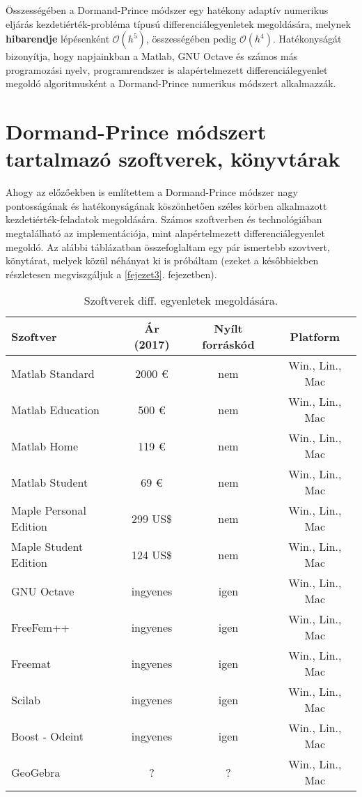 Összességében a Dormand-Prince módszer egy hatékony adaptív numerikus eljárás kezdetiérték-probléma típusú differenciálegyenletek megoldására, melynek \textbf{hibarendje} lépésenként \textbf{$\mathcal{O}(h^{5})$}, összességében pedig \textbf{ $\mathcal{O}(h^{4})$}. Hatékonyságát bizonyítja, hogy napjainkban a Matlab, GNU Octave és számos más programozási nyelv, programrendszer is alapértelmezett differenciálegyenlet megoldó algoritmusként a Dormand-Prince numerikus módszert alkalmazzák.

\section {Dormand-Prince módszert tartalmazó szoftverek, könyvtárak} \label{fejezet1_5}

Ahogy az előzőekben is említettem a Dormand-Prince módszer nagy pontosságának és hatékonyságának köszönhetően széles körben alkalmazott kezdetiérték-feladatok megoldására. Számos szoftverben és technológiában megtalálható az implementációja, mint alapértelmezett differenciálegyenlet megoldó. Az alábbi táblázatban összefoglaltam egy pár ismertebb szovtvert, könytárat, melyek közül néhányat ki is próbáltam (ezeket a későbbiekben részletesen megviszgáljuk a \ref{fejezet3}. fejezetben).
\begin{table}[h!]
	\centering
	\begin{tabular}{ | l | c | c | c |}
		\hline 
		\textbf{Szoftver} & \textbf{Ár (2017)} & \textbf{Nyílt forráskód} & \textbf{Platform}\\
		\hline
		Matlab Standard & 2000 \euro & nem & Win., Lin., Mac\\
		\hline
		Matlab Education & 500 \euro & nem & Win., Lin., Mac\\
		\hline
		Matlab Home & 119 \euro & nem & Win., Lin., Mac\\ 
		\hline
		Matlab Student & 69 \euro & nem & Win., Lin., Mac\\
		\hline
		Maple Personal Edition & 299 US\$ & nem & Win., Lin., Mac\\
		\hline
		Maple Student Edition & 124 US\$ & nem & Win., Lin., Mac\\
		\hline
		GNU Octave & ingyenes & igen & Win., Lin., Mac\\
		\hline
		FreeFem++ & ingyenes & igen & Win., Lin., Mac\\
		\hline
		Freemat & ingyenes & igen & Win., Lin., Mac\\
		\hline
		Scilab & ingyenes & igen & Win., Lin., Mac\\
		\hline
		Boost - Odeint & ingyenes & igen & Win., Lin., Mac\\
		\hline
		GeoGebra & ? & ? & Win., Lin., Mac\\
		\hline
	\end{tabular}
	\caption{Szoftverek diff. egyenletek megoldására.}
\end{table}


